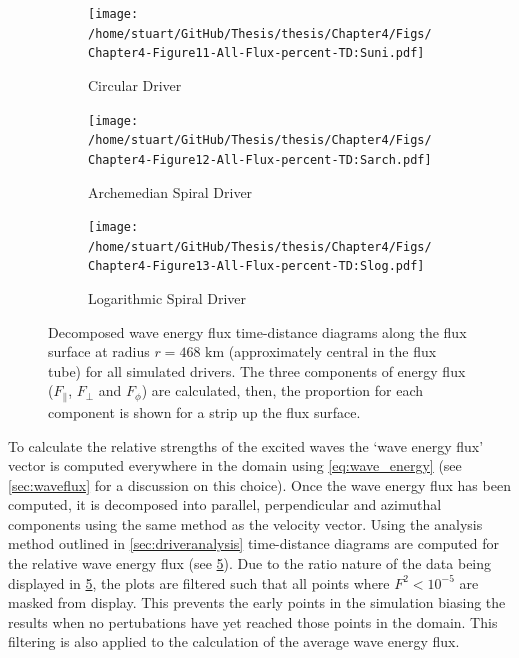\documentclass[a4paper,12pt,fourier,authoryear,custommargin]{Classes/PhDThesisPSnPDF}
\begin{document}
\begin{figure}
    \centering
\ContinuedFloat


    \begin{subfigure}[b]{0.9\columnwidth}
        \texttt{[image: /home/stuart/GitHub/Thesis/thesis/Chapter4/Figs/Chapter4-Figure11-All-Flux-percent-TD:Suni.pdf]}
        \caption{Circular Driver}
        \label{fig:All-Flux-percent-TD:Suni}
    \end{subfigure}

    \begin{subfigure}[b]{0.9\columnwidth}
        \texttt{[image: /home/stuart/GitHub/Thesis/thesis/Chapter4/Figs/Chapter4-Figure12-All-Flux-percent-TD:Sarch.pdf]}
        \caption{Archemedian Spiral Driver}
        \label{fig:All-Flux-percent-TD:Sarch}
    \end{subfigure}
    \caption{}
    \label{fig:}
\end{figure}

\begin{figure}
    \centering
\ContinuedFloat


    \begin{subfigure}[b]{0.9\columnwidth}
        \texttt{[image: /home/stuart/GitHub/Thesis/thesis/Chapter4/Figs/Chapter4-Figure13-All-Flux-percent-TD:Slog.pdf]}
        \caption{Logarithmic Spiral Driver}
        \label{fig:All-Flux-percent-TD:Slog}
    \end{subfigure}
    \caption{Decomposed wave energy flux time-distance diagrams along the flux surface at radius $r = 468$ km (approximately central in the flux tube) for all simulated drivers. The three components of energy flux ($F_\parallel$, $F_\perp$ and $F_\phi$) are calculated, then, the proportion for each component is shown for a strip up the flux surface.}
    \label{fig:All-Flux-percent-TD}
\end{figure}

To calculate the relative strengths of the excited waves the `wave energy flux' vector is computed everywhere in the domain using \cref{eq:wave_energy} (see \cref{sec:waveflux} for a discussion on this choice).
Once the wave energy flux has been computed, it is decomposed into parallel, perpendicular and azimuthal components using the same method as the velocity vector.
Using the analysis method outlined in \cref{sec:driveranalysis} time-distance diagrams are computed for the relative wave energy flux (see \cref{fig:All-Flux-percent-TD}).
Due to the ratio nature of the data being displayed in \cref{fig:All-Flux-percent-TD}, the plots are filtered such that all points where $F^2 < 10^{-5}$ are masked from display.
This prevents the early points in the simulation biasing the results when no pertubations have yet reached those points in the domain.
This filtering is also applied to the calculation of the average wave energy flux.
\end{document}
